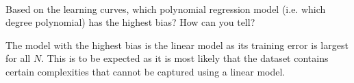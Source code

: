 \begin{solution}
  \begin{figure}[H]
    \\
  \end{figure}
  \end{solution}

\begin{problem}[3]
  Based on the learning curves, which polynomial regression model (i.e. which degree polynomial) has the highest bias? How can you tell?
\end{problem}
\begin{solution}
 The model with the highest bias is the linear model as its training error is largest for all $N$. This is to be expected as it is most likely that the dataset contains certain complexities that cannot be captured using a linear model.
\end{solution}

